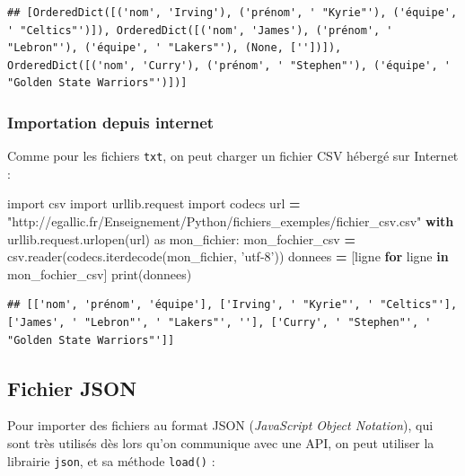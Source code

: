 \documentclass[12pt,]{book}
\newenvironment{Shaded}{\begin{snugshade}}{\end{snugshade}}
\newcommand{\KeywordTok}[1]{\textcolor[rgb]{0.13,0.29,0.53}{\textbf{#1}}}
\newcommand{\StringTok}[1]{\textcolor[rgb]{0.31,0.60,0.02}{#1}}
\newcommand{\ImportTok}[1]{#1}
\newcommand{\ControlFlowTok}[1]{\textcolor[rgb]{0.13,0.29,0.53}{\textbf{#1}}}
\newcommand{\OperatorTok}[1]{\textcolor[rgb]{0.81,0.36,0.00}{\textbf{#1}}}
\newcommand{\BuiltInTok}[1]{#1}
\newcommand{\NormalTok}[1]{#1}
\numberwithin{equation}{section}
\numberwithin{countremarque}{section}
\begin{document}
\begin{lstlisting}
## [OrderedDict([('nom', 'Irving'), ('prénom', ' "Kyrie"'), ('équipe', ' "Celtics"')]), OrderedDict([('nom', 'James'), ('prénom', ' "Lebron"'), ('équipe', ' "Lakers"'), (None, [''])]), OrderedDict([('nom', 'Curry'), ('prénom', ' "Stephen"'), ('équipe', ' "Golden State Warriors"')])]
\end{lstlisting}

\subsubsection{Importation depuis
internet}\label{importation-depuis-internet-1}

Comme pour les fichiers \texttt{txt}, on peut charger un fichier CSV
hébergé sur Internet :

\begin{Shaded}
\begin{Highlighting}[]
\ImportTok{import}\NormalTok{ csv}
\ImportTok{import}\NormalTok{ urllib.request}
\ImportTok{import}\NormalTok{ codecs}
\NormalTok{url }\OperatorTok{=} \StringTok{"http://egallic.fr/Enseignement/Python/fichiers_exemples/fichier_csv.csv"}
\ControlFlowTok{with}\NormalTok{ urllib.request.urlopen(url) }\ImportTok{as}\NormalTok{ mon_fichier:}
\NormalTok{    mon_fochier_csv }\OperatorTok{=}\NormalTok{ csv.reader(codecs.iterdecode(mon_fichier, }\StringTok{'utf-8'}\NormalTok{))}
\NormalTok{    donnees }\OperatorTok{=}\NormalTok{ [ligne }\ControlFlowTok{for}\NormalTok{ ligne }\KeywordTok{in}\NormalTok{ mon_fochier_csv]}
\BuiltInTok{print}\NormalTok{(donnees)}
\end{Highlighting}
\end{Shaded}

\begin{lstlisting}
## [['nom', 'prénom', 'équipe'], ['Irving', ' "Kyrie"', ' "Celtics"'], ['James', ' "Lebron"', ' "Lakers"', ''], ['Curry', ' "Stephen"', ' "Golden State Warriors"']]
\end{lstlisting}

\subsection{Fichier JSON}\label{fichier-json}

Pour importer des fichiers au format JSON (\emph{JavaScript Object
Notation}), qui sont très utilisés dès lors qu'on communique avec une
API, on peut utiliser la librairie \texttt{json}, et sa méthode
\texttt{load()} :
\end{document}
